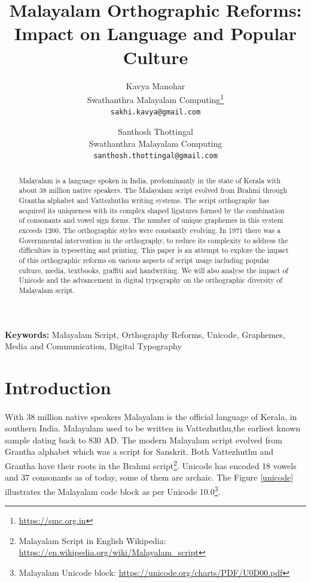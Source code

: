 \documentclass[10pt]{article}
\title{Malayalam Orthographic Reforms: \\Impact on Language and Popular Culture}
\author{Kavya Manohar \\
\small{Swathanthra Malayalam Computing\footnote{\url{https://smc.org.in}}} \\
 {\small {\tt sakhi.kavya@gmail.com}} \\
 \and
 Santhosh Thottingal \\
 \small{Swathanthra Malayalam Computing} \\
 {\small {\tt santhosh.thottingal@gmail.com}}}
\date{}
\begin{document}
\maketitle
\thispagestyle{empty}

\begin{abstract}

Malayalam is a language spoken in India, predominantly in the state of Kerala with about 38 million native speakers. The Malayalam script evolved from Brahmi through Grantha alphabet and Vattezhuthu writing systems. The script orthography has acquired its uniqueness with its complex shaped ligatures formed by the combination of consonants and vowel sign forms. The number of unique graphemes in this system exceeds 1200. The orthographic styles were constantly evolving. In 1971 there was a Governmental intervention in the orthography, to reduce its complexity to address the difficulties in typesetting and printing. This paper is an attempt to explore the impact of this orthographic reforms on various aspects of script usage including popular culture, media, textbooks, graffiti and handwriting. We will also analyse the impact of Unicode and the advancement in digital typography on the orthographic diversity of Malayalam script.

\end{abstract}
 \textbf{Keywords:} Malayalam Script, Orthography Reforms, Unicode, Graphemes, Media and Communication, Digital Typography

\section{Introduction}

\paragraph{}
With 38 million native speakers Malayalam is the official language of Kerala, in southern India. Malayalam used to be written in Vattezhuthu,the earliest known sample dating back to 830 AD. The modern Malayalam script evolved from Grantha alphabet which was a script for Sanskrit. Both Vattezhuthu and Grantha have their roots in the Brahmi script\footnote{Malayalam Script in English Wikipedia: \url{https://en.wikipedia.org/wiki/Malayalam_script}}. Unicode has encoded 18 vowels and 37 consonants as of today, some of them are archaic.  The Figure \ref{unicode} illustrates the Malayalam code block as per Unicode 10.0\footnote{Malayalam Unicode block: \url{https://unicode.org/charts/PDF/U0D00.pdf}}. 
\end{document}
